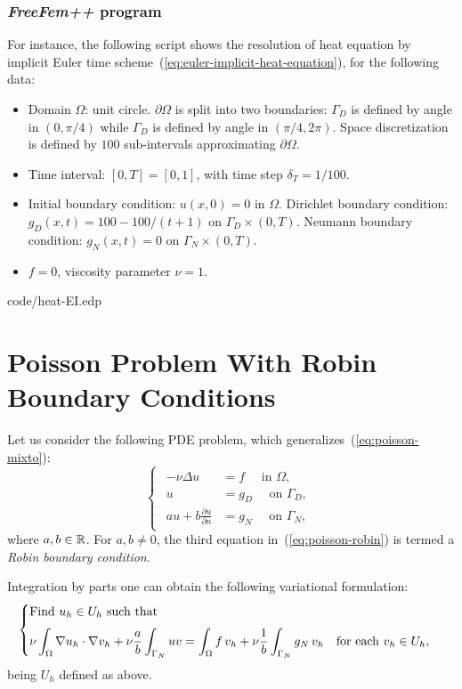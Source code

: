 \documentclass[12pt]{article}
\newcommand{\FF}{\textit{FreeFem++}\xspace}
\begin{document}
\subsubsection{\FF program}
For instance, the following script shows the resolution of heat
equation by implicit Euler time
scheme~(\ref{eq:euler-implicit-heat-equation}), for the following data:
\begin{itemize}
\item Domain $\Omega$: unit circle.  $\partial\Omega$ is split
  into two boundaries: $\Gamma_D$ is defined by angle in $(0,\pi/4)$
  while $\Gamma_D$ is defined by angle in $(\pi/4,2\pi)$. Space
  discretization is defined by $100$ sub-intervals approximating
  $\partial\Omega$.
\item Time interval: $[0,T]=[0,1]$, with time step $\delta_T=1/100$.
\item Initial boundary condition: $u(x,0)=0$ in $\Omega$. Dirichlet
  boundary condition: $g_D(x,t)= 100-100/(t+1)$ on
  $\Gamma_D\times (0,T)$. Neumann boundary condition: $g_N(x,t)=0$ on
  $\Gamma_N\times (0,T)$.
\item $f=0$, viscosity parameter $\nu=1$.
\end{itemize}


{code/heat-EI.edp}

\appendix

\section{Poisson Problem With Robin Boundary Conditions}

Let us consider the following PDE problem, which generalizes~(\ref{eq:poisson-mixto}):
\begin{equation}
  \label{eq:poisson-robin}
  \begin{cases}
    \begin{aligned}
      -\nu\Delta u &= f \quad \text{ in } \Omega, \\
      u &= g_D \quad \text{ on } \Gamma_D, \\
      au + b \frac{\partial u}{\partial n} &= g_N \quad \text{ on } \Gamma_N,
    \end{aligned}
  \end{cases}
\end{equation}
where $a,b\in{\mathbb R}$. For $a,b\neq 0$, the third equation
in~(\ref{eq:poisson-robin}) is termed a \textit{Robin boundary
  condition}.

Integration by parts one can obtain the following variational formulation:
\begin{equation*}
  \begin{cases}
    \text{Find $u_h\in U_{h}$ such that}
    \\\noalign{\medskip}
    \begin{aligned}
      \nu\int_\Omega \nabla u_h \cdot \nabla v_h
      + \nu\frac a b \int_{\Gamma_N} u v
      = \int_\Omega f\, v_h
      + \nu \frac 1b \int_{\Gamma_N} g_N\, v_h
      \quad\text{for each } v_h\in U_{h},
    \end{aligned}
  \end{cases}
\end{equation*}
being $U_h$ defined as above.
\end{document}

